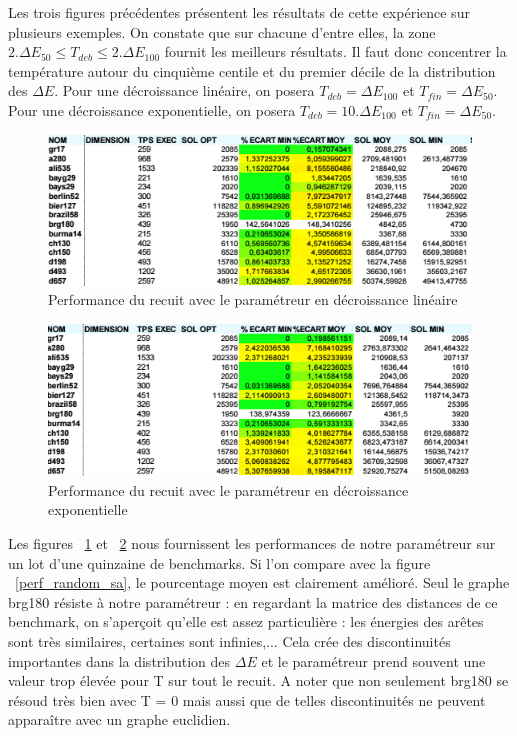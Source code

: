 \documentclass{article}%
\begin{document}
		Les trois figures précédentes présentent les résultats de cette expérience sur plusieurs exemples. On constate que sur chacune d'entre elles, la zone $ 2. \Delta E_{50} \leq T_{deb} \leq 2. \Delta E_{100} $ fournit les meilleurs résultats. Il faut donc concentrer la température autour du cinquième centile et du premier décile de la distribution des $ \Delta E $.
		Pour une décroissance linéaire, on posera $ T_{deb} = \Delta E_{100} $ et $ T_{fin} = \Delta E_{50} $. 
		Pour une décroissance exponentielle, on posera $ T_{deb} = 10.\Delta E_{100} $ et $ T_{fin} = \Delta E_{50} $.
		
	\begin{figure}[!h]
	\begin{center}
	\includegraphics[scale=0.4]{perf_lin.png}
	\caption{Performance du recuit avec le paramétreur en décroissance linéaire}
	\label{perf_lin}
	\end{center}
	\end{figure}
	
	\begin{figure}[!h]
	\begin{center}
	\includegraphics[scale=0.4]{perf_exp.png}
	\caption{Performance du recuit avec le paramétreur en décroissance exponentielle}
	\label{perf_exp}
	\end{center}
	\end{figure}
	
	Les figures ~\ref{perf_lin} et ~\ref{perf_exp} nous fournissent les performances de notre paramétreur sur un lot d'une quinzaine de benchmarks. Si l'on compare avec la figure ~\ref{perf_random_sa}, le pourcentage moyen est clairement amélioré. Seul le graphe brg180 résiste à notre paramétreur : en regardant la matrice des distances de ce benchmark, on s'aperçoit qu'elle est assez particulière : les énergies des arêtes sont très similaires, certaines sont infinies,... Cela crée des discontinuités importantes dans la distribution des $ \Delta E $ et le paramétreur prend souvent une valeur trop élevée pour T sur tout le recuit. A noter que non seulement brg180 se résoud très bien avec T = 0 mais aussi que de telles discontinuités ne peuvent apparaître avec un graphe euclidien.
	
\end{document}
